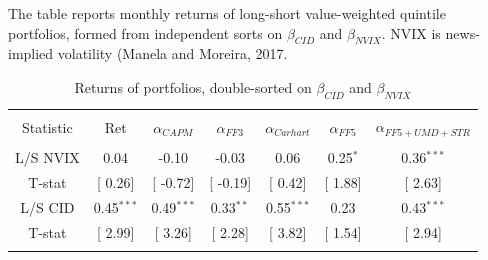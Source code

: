 \documentclass[12pt]{article}
\begin{document}
\begin{table}[!htbp] \centering 
  \caption{Returns of portfolios, double-sorted on $\beta_{CID}$ and $\beta_{NVIX}$} 
  \label{} 
    \begin{flushleft}
    {\medskip\small
 The table reports monthly returns of long-short value-weighted quintile portfolios, formed from independent sorts on $\beta_{CID}$ and $\beta_{NVIX}$. NVIX is news-implied volatility (Manela and Moreira, 2017.}
    \medskip
    \end{flushleft}
\begin{tabular}{@{\extracolsep{5pt}} ccccccc} 
\\[-1.8ex]\hline 
\hline \\[-1.8ex] 
Statistic & Ret & $\alpha_{CAPM}$ & $\alpha_{FF3}$ & $\alpha_{Carhart}$ & $\alpha_{FF5}$ & $\alpha_{FF5+UMD+STR}$ \\ 
\hline \\[-1.8ex] 
L/S NVIX & 0.04 & -0.10 & -0.03 & 0.06 & 0.25$^{*}$ & 0.36$^{***}$ \\ 
T-stat & [ 0.26] & [ -0.72] & [ -0.19] & [ 0.42] & [ 1.88] & [ 2.63] \\ 
L/S CID & 0.45$^{***}$ & 0.49$^{***}$ & 0.33$^{**}$ & 0.55$^{***}$ & 0.23 & 0.43$^{***}$ \\ 
T-stat & [ 2.99] & [ 3.26] & [ 2.28] & [ 3.82] & [ 1.54] & [ 2.94] \\ 
\hline \\[-1.8ex] 
\end{tabular} 
\end{table}
\end{document}
